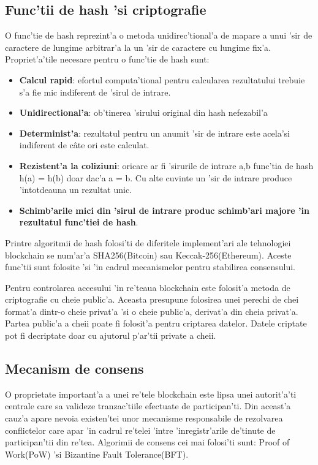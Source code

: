 \documentclass[12pt,a4paper,twoside]{report}
\begin{document}
\subsection{Func'tii de hash 'si criptografie}
	O func'tie de hash reprezint'a o metoda unidirec'tional'a de mapare a unui 'sir de caractere de lungime arbitrar'a la un 'sir de caractere cu lungime fix'a. Propriet'a'tile necesare pentru o func'tie de hash sunt:
	\begin{itemize}
		\item \textbf{Calcul rapid}: efortul computa'tional pentru calcularea rezultatului trebuie s'a fie mic indiferent de 'sirul de intrare.
		\item \textbf{Unidirectional'a}: ob'tinerea 'sirului original din hash nefezabil'a
		\item \textbf{Determinist'a}: rezultatul pentru un anumit 'sir de intrare este acela'si indiferent de c\^ate ori este calculat. 
		\item \textbf{Rezistent'a la coliziuni}: oricare ar fi 'sirurile de intrare a,b func'tia de hash h(a) = h(b) doar dac'a a = b. Cu alte cuvinte un 'sir de intrare produce 'intotdeauna un rezultat unic.
		\item \textbf{Schimb'arile mici din 'sirul de intrare produc schimb'ari majore 'in rezultatul func'tiei de hash}.
\end{itemize}		
	 Printre algoritmii de hash folosi'ti de diferitele implement'ari ale tehnologiei blockchain se num'ar'a SHA256(Bitcoin)\cite{bitcoin} sau Keccak-256(Ethereum)\cite{eth-yellow}. Aceste func'tii sunt folosite 'si 'in cadrul mecanismelor  pentru stabilirea consensului.
	 
	 
		Pentru controlarea accesului 'in re'teaua blockchain este folosit'a metoda de criptografie cu cheie public'a. Aceasta presupune folosirea unei perechi de chei format'a dintr-o cheie privat'a 'si o cheie public'a, derivat'a din cheia privat'a. Partea public'a a cheii poate fi folosit'a pentru criptarea datelor. Datele criptate pot fi decriptate doar cu ajutorul p'ar'tii private a cheii\cite{crypto}. 
		\subsection{Mecanism de consens}
		O proprietate important'a a unei re'tele blockchain este lipsa unei autorit'a'ti centrale care sa valideze tranzac'tiile efectuate de participan'ti. Din aceast'a cauz'a apare nevoia existen'tei unor mecanisme responsabile de rezolvarea conflictelor care apar 'in cadrul re'telei 'intre 'inregistr'arile de'tinute de participan'tii din re'tea. Algorimii de consens cei mai folosi'ti sunt: Proof of Work(PoW) 'si Bizantine Fault Tolerance(BFT).
	
\end{document}
